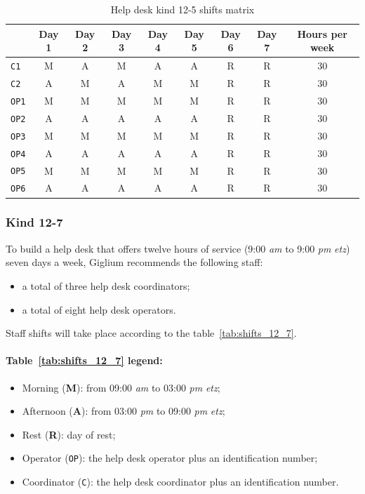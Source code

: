 \begin{table}[H]
	\centering
	\begin{tabular}{|l|c|c|c|c|c|c|c|c|} 
		\hline
		& \textbf{Day 1} & \textbf{Day 2} & \textbf{Day 3} & \textbf{Day 4} & \textbf{Day 5} & \textbf{Day 6} & \textbf{Day 7} & \textbf{Hours per week}\\ 
		\hline
		\texttt{C1} & M & A & M & A & A & R & R & 30\\
		\hline
		\texttt{C2} & A & M & A & M & M & R & R & 30\\
		\hline
		\texttt{OP1} & M & M & M & M & M & R & R & 30\\
		\hline
		\texttt{OP2} & A & A & A & A & A & R & R & 30\\
		\hline
		\texttt{OP3} & M & M & M & M & M & R & R & 30\\
		\hline
		\texttt{OP4} & A & A & A & A & A & R & R & 30\\
		\hline
		\texttt{OP5} & M & M & M & M & M & R & R & 30\\
		\hline
		\texttt{OP6} & A & A & A & A & A & R & R & 30\\
		\hline
	\end{tabular}
	\caption{Help desk kind 12{-}5 shifts matrix}\label{tab:shifts_12_5}
\end{table}

\subsubsection{Kind 12{-}7}\label{12_7}
To build a help desk that offers twelve hours of service (9:00 \textit{\gls{am}} to 9:00 \textit{\gls{pm}} \textit{\gls{etz}}) seven days a week, Giglium recommends the following staff:
\begin{itemize}
	\item a total of three help desk coordinators;
	\item a total of eight help desk operators.
\end{itemize}

\noindent Staff shifts will take place according to the table~\ref{tab:shifts_12_7}.

\paragraph{Table~\ref{tab:shifts_12_7} legend:}
\begin{itemize}
	\item Morning (\textbf{M}): from 09:00 \textit{\gls{am}} to 03:00 \textit{\gls{pm}} \textit{\gls{etz}};
	\item Afternoon (\textbf{A}): from 03:00 \textit{\gls{pm}} to 09:00 \textit{\gls{pm}} \textit{\gls{etz}};
	\item Rest (\textbf{R}): day of rest;
	\item Operator (\texttt{OP}): the help desk operator plus an identification number;
	\item Coordinator (\texttt{C}): the help desk coordinator plus an identification number.
\end{itemize}


